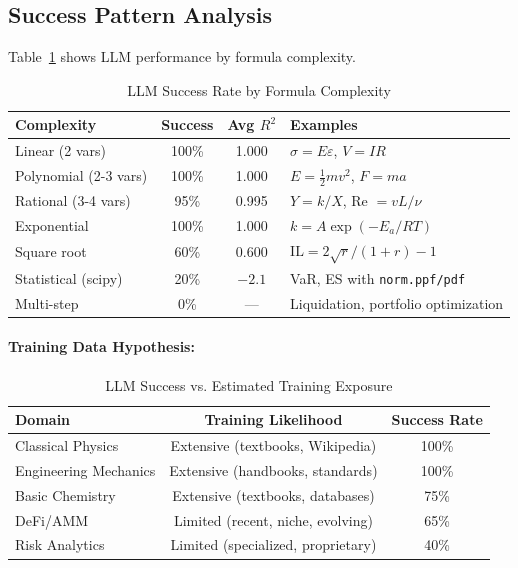 \documentclass[twoside,11pt]{article}
\begin{document}
\subsection{Success Pattern Analysis}

Table~\ref{tab:llm_success_patterns} shows LLM performance by formula complexity.

\begin{table}[htbp]
\centering
\caption{LLM Success Rate by Formula Complexity}
\label{tab:llm_success_patterns}
\begin{tabular}{@{}lccp{5cm}@{}}
\toprule
\textbf{Complexity} & \textbf{Success} & \textbf{Avg $R^2$} & \textbf{Examples} \\
\midrule
Linear (2 vars) & 100\% & 1.000 & $\sigma = E\varepsilon$, $V = IR$ \\
Polynomial (2-3 vars) & 100\% & 1.000 & $E = \frac{1}{2}mv^2$, $F = ma$ \\
Rational (3-4 vars) & 95\% & 0.995 & $Y = k/X$, Re $= vL/\nu$ \\
Exponential & 100\% & 1.000 & $k = A \exp(-E_a/RT)$ \\
Square root & 60\% & 0.600 & $\text{IL} = 2\sqrt{r}/(1+r) - 1$ \\
Statistical (scipy) & 20\% & $-2.1$ & VaR, ES with \texttt{norm.ppf/pdf} \\
Multi-step & 0\% & --- & Liquidation, portfolio optimization \\
\bottomrule
\end{tabular}
\end{table}

\paragraph{Training Data Hypothesis:}

\begin{table}[htbp]
\centering
\caption{LLM Success vs. Estimated Training Exposure}
\label{tab:training_exposure}
\begin{tabular}{@{}lcc@{}}
\toprule
\textbf{Domain} & \textbf{Training Likelihood} & \textbf{Success Rate} \\
\midrule
Classical Physics & Extensive (textbooks, Wikipedia) & 100\% \\
Engineering Mechanics & Extensive (handbooks, standards) & 100\% \\
Basic Chemistry & Extensive (textbooks, databases) & 75\% \\
DeFi/AMM & Limited (recent, niche, evolving) & 65\% \\
Risk Analytics & Limited (specialized, proprietary) & 40\% \\
\bottomrule
\end{tabular}
\end{table}
\end{document}
